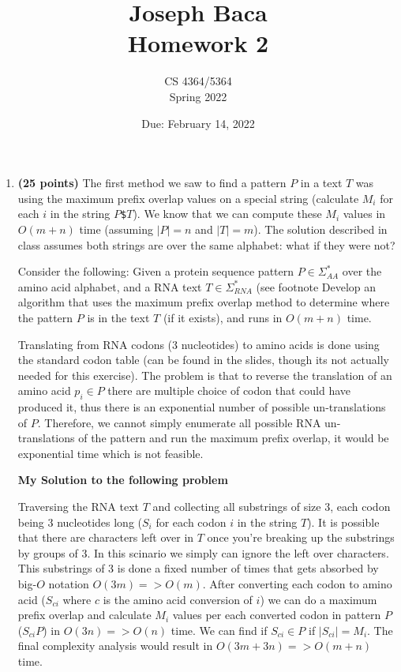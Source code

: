 \documentclass[11pt, oneside]{article}
\title{Joseph Baca \\ Homework 2}
\author{CS 4364/5364\\Spring 2022}
\date{Due: February 14, 2022}
\begin{document}
\maketitle

\begin{enumerate}


	\item \textbf{(25 points)}
	      The first method we saw to find a pattern $P$ in a text $T$ was using the maximum prefix overlap values on a special string (calculate $M_i$ for each $i$ in the string $P$\texttt{\$}$T$).
	      We know that we can compute these $M_i$ values in $O(m+n)$ time (assuming $|P|=n$ and $|T|=m$).
	      The solution described in class assumes both strings are over the same alphabet: what if they were not?

	      Consider the following:
	      Given a protein sequence pattern $P\in\Sigma_{AA}^*$ over the amino acid alphabet, and a RNA text $T\in\Sigma_{RNA}^*$
	      (see footnote
	      Develop an algorithm that uses the maximum prefix overlap method to determine where the pattern $P$ is in the text $T$ (if it exists),
	      and runs in $O(m+n)$ time.

	      Translating from RNA codons (3 nucleotides) to amino acids is done using the standard codon table (can be found in the slides, though its not actually needed for this exercise).
	      The problem is that to reverse the translation of an amino acid $p_i \in P$ there are multiple choice of codon that could have produced it,
	      thus there is an exponential number of possible un-translations of $P$.
	      Therefore, we cannot simply enumerate all possible RNA un-translations of the pattern and run the maximum prefix overlap, it would be exponential time which is not feasible.


	\begin{center}
		\textbf{My Solution to the following problem}
	\end{center}

	Traversing the RNA text $T$ and collecting all substrings of size 3, each codon being 3 nucleotides long ($S_{i}$ for each codon $i$ in the string $T$). It is possible that there are characters left over in $T$ once you're breaking up the substrings by groups of 3. In this scinario we simply can ignore the left over characters. This substrings of 3 is done a fixed number of times that gets absorbed by big-$O$ notation $O(3m) => O(m)$. After converting each codon to amino acid ($S_{ci}$ where $c$ is the amino acid conversion of $i$) we can do a maximum prefix overlap and calculate $M_{i}$ values per each converted codon in pattern $P$ ($S_{ci}$\text{\$}$P$) in $O(3n) => O(n)$ time. We can find if $S_{ci} \in P$ if $|S_{ci}| = M_{i}$. The final complexity analysis would result in $O(3m+3n) => O(m+n)$ time.




\end{enumerate}
\end{document}
